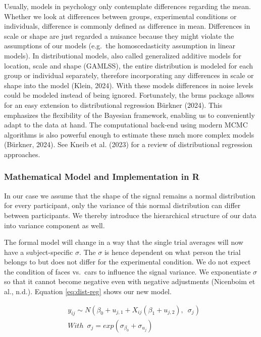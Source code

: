 \documentclass[
  doc,12pt,floatsintext]{apa7}
\begin{document}
Usually, models in psychology only contemplate differences regarding the mean. Whether we look at differences between groups, experimental conditions or individuals, difference is commonly defined as difference in mean. Differences in scale or shape are just regarded a nuisance because they might violate the assumptions of our models (e.g.~the homoscedasticity assumption in linear models). In distributional models, also called generalized additive models for location, scale and shape (GAMLSS), the entire distribution is modeled for each group or individual separately, therefore incorporating any differences in scale or shape into the model (Klein, 2024). With these models differences in noise levels could be modeled instead of being ignored. Fortunately, the brms package allows for an easy extension to distributional regression Bürkner (2024). This emphasizes the flexibility of the Bayesian framework, enabling us to conveniently adapt to the data at hand. The computational back-end using modern MCMC algorithms is also powerful enough to estimate these much more complex models (Bürkner, 2024). See Kneib et al. (2023) for a review of distributional regression approaches.

\subsubsection{Mathematical Model and Implementation in R}\label{mathematical-model-and-implementation-in-r-1}

In our case we assume that the shape of the signal remains a normal distribution for every participant, only the variance of this normal distribution can differ between participants. We thereby introduce the hierarchical structure of our data into variance component as well.

The formal model will change in a way that the single trial averages will now have a subject-specific \(\sigma\). The \(\sigma\) is hence dependent on what person the trial belongs to but does not differ for the experimental condition. We do not expect the condition of faces vs.~cars to influence the signal variance. We exponentiate \(\sigma\) so that it cannot become negative even with negative adjustments (Nicenboim et al., n.d.). Equation \eqref{eq:dist-reg} shows our new model.

\begin{equation}
\begin{split}
& y_{ij} \sim N(\beta_0 + u_{j,1} + X_{ij}(\beta_1 + u_{j,2}), \enspace \sigma_j) \\
& With \enspace \sigma_j = exp(\sigma_{\beta_0} + \sigma_{u_j})
\end{split}
\label{eq:dist-reg}
\end{equation}
\end{document}
